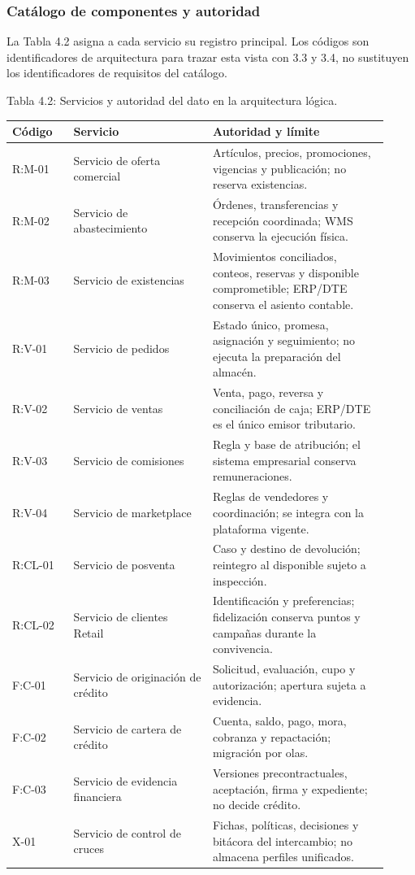 \documentclass[11pt]{article}
\begin{document}
\subsubsection{Catálogo de componentes y autoridad}

La Tabla 4.2 asigna a cada servicio su registro principal. Los códigos son identificadores de arquitectura para trazar esta vista con 3.3 y 3.4, no sustituyen los identificadores de requisitos del catálogo.

Tabla 4.2: Servicios y autoridad del dato en la arquitectura lógica.

\begin{longtable}{@{}p{0.15\linewidth}p{0.34\linewidth}p{0.43\linewidth}@{}}
\toprule Código & Servicio & Autoridad y límite \\
\midrule\endhead\bottomrule\endlastfoot
R:M-01 & Servicio de oferta comercial & Artículos, precios, promociones, vigencias y publicación; no reserva existencias. \\
R:M-02 & Servicio de abastecimiento & Órdenes, transferencias y recepción coordinada; WMS conserva la ejecución física. \\
R:M-03 & Servicio de existencias & Movimientos conciliados, conteos, reservas y disponible comprometible; ERP/DTE conserva el asiento contable. \\
R:V-01 & Servicio de pedidos & Estado único, promesa, asignación y seguimiento; no ejecuta la preparación del almacén. \\
R:V-02 & Servicio de ventas & Venta, pago, reversa y conciliación de caja; ERP/DTE es el único emisor tributario. \\
R:V-03 & Servicio de comisiones & Regla y base de atribución; el sistema empresarial conserva remuneraciones. \\
R:V-04 & Servicio de marketplace & Reglas de vendedores y coordinación; se integra con la plataforma vigente. \\
R:CL-01 & Servicio de posventa & Caso y destino de devolución; reintegro al disponible sujeto a inspección. \\
R:CL-02 & Servicio de clientes Retail & Identificación y preferencias; fidelización conserva puntos y campañas durante la convivencia. \\
F:C-01 & Servicio de originación de crédito & Solicitud, evaluación, cupo y autorización; apertura sujeta a evidencia. \\
F:C-02 & Servicio de cartera de crédito & Cuenta, saldo, pago, mora, cobranza y repactación; migración por olas. \\
F:C-03 & Servicio de evidencia financiera & Versiones precontractuales, aceptación, firma y expediente; no decide crédito. \\
X-01 & Servicio de control de cruces & Fichas, políticas, decisiones y bitácora del intercambio; no almacena perfiles unificados. \\
\end{longtable}
\end{document}
